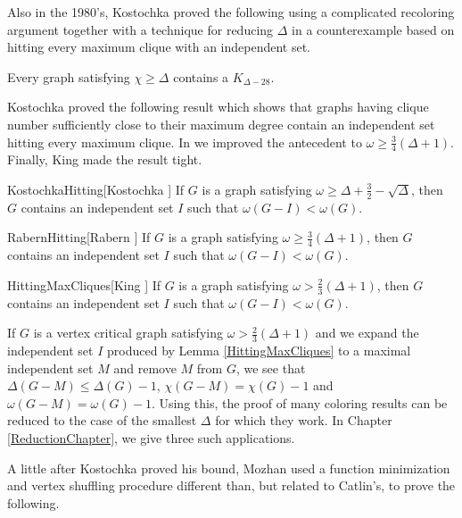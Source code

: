 Also in the 1980's, Kostochka proved the following using a complicated recoloring argument together with a technique for reducing $\Delta$ in a counterexample 
based on hitting every maximum clique with an independent set.

\begin{thm}\label{KostochkaBK}
Every graph satisfying $\chi \geq \Delta$ contains a $K_{\Delta - 28}$.
\end{thm}

Kostochka \cite{kostochkaRussian} proved the following result which shows that
graphs having clique number sufficiently close to their maximum degree contain
an independent set hitting every maximum clique. In \cite{rabernhitting} we
improved the antecedent to $\omega \geq \frac34(\Delta + 1)$.  Finally, King  \cite{KingHitting} made the result tight.

\begin{replem}{KostochkaHitting}[Kostochka \cite{kostochkaRussian}]
If $G$ is a graph satisfying $\omega \geq \Delta + \frac32 - \sqrt{\Delta}$,
then $G$ contains an independent set $I$ such that $\omega(G - I) < \omega(G)$.
\end{replem}
\begin{replem}{RabernHitting}[Rabern \cite{rabernhitting}]
If $G$ is a graph satisfying $\omega \geq \frac34 (\Delta + 1)$,
then $G$ contains an independent set $I$ such that $\omega(G - I) < \omega(G)$.
\end{replem}
\begin{replem}{HittingMaxCliques}[King \cite{KingHitting}]
If $G$ is a graph satisfying $\omega > \frac23 (\Delta + 1)$, then $G$ contains
an independent set $I$ such that $\omega(G - I) < \omega(G)$.
\end{replem}

If $G$ is a vertex critical graph satisfying $\omega > \frac23 (\Delta + 1)$ and
we expand the independent set $I$ produced by Lemma \ref{HittingMaxCliques} to a
maximal independent set $M$ and remove $M$ from $G$, we see that $\Delta(G-M)
\leq \Delta(G) - 1$, $\chi(G-M) = \chi(G) - 1$ and $\omega(G - M) = \omega(G) - 1$. Using this, the proof of many coloring results can be reduced to the case of the
smallest $\Delta$ for which they work. In Chapter
\ref{ReductionChapter}, we give three such applications.

A little after Kostochka proved his bound, Mozhan \cite{mozhan1983}
used a function minimization and vertex shuffling procedure different than, but related to Catlin's, to prove the following.  

